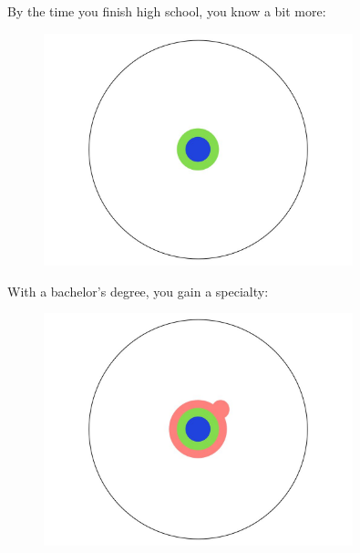 \documentclass[10pt]{beamer}
\begin{document}
\begin{frame}{}
  By the time you finish high school, you know a bit more:
  \begin{figure}[hb]
    \centering
    \includegraphics[width=0.8\textwidth]{images/PhDKnowledge-003.png}
  \end{figure}
\end{frame}


\begin{frame}{}
  With a bachelor's degree, you gain a specialty:
  \begin{figure}[hb]
    \centering
    \includegraphics[width=0.8\textwidth]{images/PhDKnowledge-004.png}
  \end{figure}
\end{frame}
\end{document}
